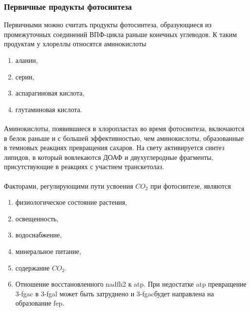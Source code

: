 
\subsubsection*{Первичные продукты фотосинтеза}

Первичными можно считать продукты фотосинтеза, образующиеся из промежуточных соединений ВПФ-цикла раньше конечных углеводов. 
К таким продуктам у хлореллы относятся аминокислоты 

\begin{enumerate}

\item аланин, 
\item серин, 
\item аспарагиновая кислота, 
\item глутаминовая кислота. 

\end{enumerate}

\paragraph*{}Аминокислоты, появившиеся в хлоропластах во время фотосинтеза, включаются в белок раньше и с большей эффективностью, чем аминокислоты, образованные в темновых реакциях превращения сахаров. 
На свету активируется синтез липидов, в который вовлекаются ДОАФ и двухуглеродные фрагменты, присутствующие в реакциях с участием транскетолаз.

\paragraph*{}Факторами, регулирующими пути усвоения $CO_{2}$ при фотосинтезе, являются 

\begin{enumerate}

\item физиологическое состояние растения, 
\item освещенность, 
\item водоснабжение,
\item минеральное питание, 
\item содержание $CO_{2}$. 
\item Отношение восстановленного \gls{nadfh2} к \gls{atp}. При недостатке \gls{atp} превращение 3-\gls{fgac} в 3-\gls{fgal} может быть затруднено и 3-\gls{fgac}будет направлена на образование \gls{fep}.

\end{enumerate}

